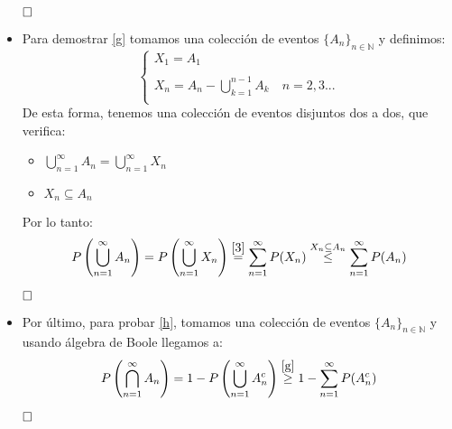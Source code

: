 \documentclass[a4paper, 12pt]{article}
\theoremstyle{plain}
\theoremstyle{definition}
\theoremstyle{remark}
\begin{document}
\begin{itemize}
		$\hfill\square$
		\item Para demostrar \ref{g} tomamos una colección de eventos $\{A_n\}_{n\in\mathbb{N}}$ y definimos:
		\[
		\left\{ \begin{array}{lcc}
		X_1=A_1 \\
		\\ X_n=A_n-\bigcup_{k=1}^{n-1}A_k \quad n=2,3...  \\
		\end{array}\]
		De esta forma, tenemos una colección de eventos disjuntos dos a dos, que verifica:
			\begin{itemize}
				\item $\bigcup_{n=1}^{\infty}A_n=\bigcup_{n=1}^{\infty}X_n$
				\item $X_n\subseteq A_n$
			\end{itemize}
		Por lo tanto:
		\[
		P\left(\bigcup_{n=1}^\infty A_n\right)=P\left(\bigcup_{n=1}^\infty X_n\right)\overset{\ref{3}}{=}\sum_{n=1}^{\infty}P(X_n)\overset{X_n\subseteq A_n}{\leq}\sum_{n=1}^{\infty}P(A_n)
		\]
		
		$\hfill\square$
		\item Por último, para probar \ref{h}, tomamos una colección de eventos $\{A_n\}_{n\in\mathbb{N}}$ y usando álgebra de Boole llegamos a:
		\[
		P\left(\bigcap_{n=1}^{\infty}A_n\right)=1-P\left(\bigcup_{n=1}^\infty A_n^c\right)\overset{\ref{g}}{\geq}1-\sum_{n=1}^\infty P(A_n^c)
		\]
		
		$\hfill\square$
	\end{itemize}
\end{document}
